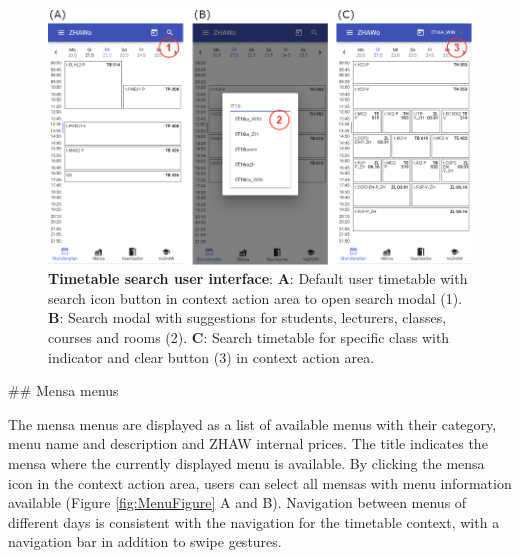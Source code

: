 \begin{markdown}
\begin{figure}[H]
  \includegraphics[width=16cm, center]{./figures/timetable_figure2.png}
  \captionsetup{width=15.5cm}
  \caption[Timetable search user interface]{\textbf{Timetable search user interface}: \textbf{A}: Default user timetable with search icon button in context action area to open search modal (1). \textbf{B}: Search modal with suggestions for students, lecturers, classes, courses and rooms (2). \textbf{C}: Search timetable for specific class with indicator and clear button (3) in context action area.}
  \label{fig:TimetableFigure2}
\end{figure}

\newpage

## Mensa menus

The mensa menus are displayed as a list of available menus with their category, menu name and description and ZHAW internal prices. The title indicates the mensa where the currently displayed menu is available. By clicking the mensa icon in the context action area, users can select all mensas with menu information available (Figure \ref{fig:MenuFigure} A and B). Navigation between menus of different days is consistent with the navigation for the timetable context, with a navigation bar in addition to swipe gestures.

\bigskip


\end{markdown}
